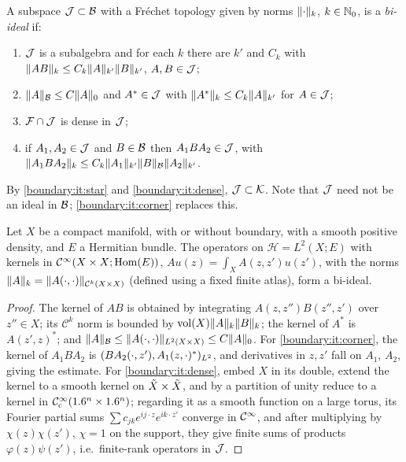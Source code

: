 \begin{definition}\label{boundary:def:biideal}
A subspace $\mathcal{J}\subset\mathcal{B}$ with a Fr\'echet topology given by norms
$\lVert \cdot\rVert_k$, $k\in\mathbb{N}_0$, is a \emph{bi-ideal} if:
\begin{enumerate}[label=(\alph*)]
\item\label{boundary:it:alg} $\mathcal{J}$ is a subalgebra and for each $k$ there are $k'$ and
$C_k$ with $\lVert AB\rVert_k\le C_k\lVert A\rVert_{k'}\lVert B\rVert_{k'}$, $A,B\in\mathcal{J}$;
\item\label{boundary:it:star} $\lVert A\rVert_{\mathcal{B}}\le C\lVert A\rVert_0$ and $A^*\in\mathcal{J}$ with
$\lVert A^*\rVert_k\le C_k\lVert A\rVert_{k'}$ for $A\in\mathcal{J}$;
\item\label{boundary:it:dense} $\mathcal{F}\cap\mathcal{J}$ is dense in $\mathcal{J}$;
\item\label{boundary:it:corner} if $A_1,A_2\in\mathcal{J}$ and $B\in\mathcal{B}$ then $A_1BA_2\in\mathcal{J}$,
with $\lVert A_1BA_2\rVert_k\le C_k\lVert A_1\rVert_{k'}\lVert B\rVert_{\mathcal{B}}\lVert A_2\rVert_{k'}$.
\end{enumerate}
\end{definition}

By \ref{boundary:it:star} and \ref{boundary:it:dense}, $\mathcal{J}\subset\mathcal{K}$. Note that
$\mathcal{J}$ need not be an ideal in $\mathcal{B}$; \ref{boundary:it:corner} replaces this.

\begin{proposition}\label{boundary:prop:smoothing-biideal}
Let $X$ be a compact manifold, with or without boundary, with a smooth positive
density, and $E$ a Hermitian bundle. The operators on $\mathcal{H}=L^2(X;E)$ with
kernels in $\mathcal{C}^\infty(X\times X;\operatorname{Hom}(E))$, $Au(z)=\int_XA(z,z')u(z')$, with the norms
$\lVert A\rVert_k=\lVert A(\cdot,\cdot)\rVert_{\mathcal{C}^k(X\times X)}$ (defined using a fixed
finite atlas), form a bi-ideal.
\end{proposition}
\begin{proof}
The kernel of $AB$ is obtained by integrating $A(z,z'')B(z'',z')$ over $z''\in X$; its $\mathcal{C}^k$ norm is
bounded by $\operatorname{vol}(X)\lVert A\rVert_k\lVert B\rVert_k$; the kernel of $A^*$ is
$A(z',z)^*$; and $\lVert A\rVert_{\mathcal{B}}\le\lVert A(\cdot,\cdot)\rVert_{L^2(X\times X)}\le C\lVert A\rVert_0$.
For \ref{boundary:it:corner}, the kernel of $A_1BA_2$ is $( BA_2(\cdot,z'), A_1(z,
\cdot)^*)_{L^2}$, and derivatives in $z,z'$ fall on $A_1$, $A_2$, giving the estimate.
For \ref{boundary:it:dense}, embed $X$ in its double, extend the kernel to a smooth
kernel on $\tilde{X}\times\tilde{X}$, and by a partition of unity reduce to a kernel in
$\mathcal{C}^\infty_{\mathrm{c}}(1.6^n\times1.6^n)$; regarding it as a smooth function on a large torus, its Fourier
partial sums $\sum c_{jk}e^{ij\cdot z}e^{ik\cdot z'}$ converge in $\mathcal{C}^\infty$, and after
multiplying by $\chi(z)\chi(z')$, $\chi=1$ on the support, they give finite sums of
products $\varphi(z)\psi(z')$, i.e.\ finite-rank operators in $\mathcal{J}$.
\end{proof}

